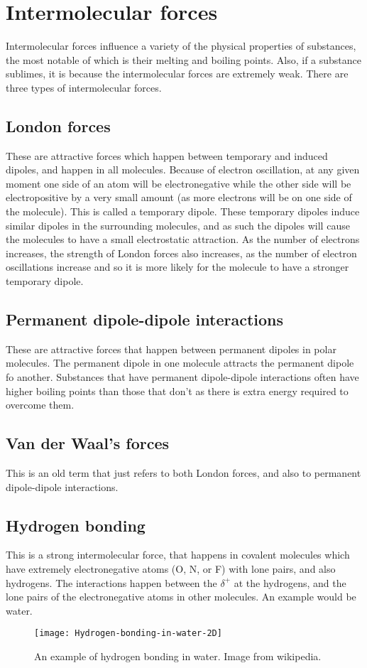 \section{Intermolecular forces}
Intermolecular forces influence a variety of the physical properties of substances, the most notable of which is their melting and boiling points. Also, if a substance sublimes, it is because the intermolecular forces are extremely weak. There are three types of intermolecular forces.

\subsection{London forces}
These are attractive forces which happen between temporary and induced dipoles, and happen in all molecules. Because of electron oscillation, at any given moment one side of an atom will be electronegative while the other side will be electropositive by a very small amount (as more electrons will be on one side of the molecule). This is called a temporary dipole. These temporary dipoles induce similar dipoles in the surrounding molecules, and as such the dipoles will cause the molecules to have a small electrostatic attraction. As the number of electrons increases, the strength of London forces also increases, as the number of electron oscillations increase and so it is more likely for the molecule to have a stronger temporary dipole.

\subsection{Permanent dipole-dipole interactions}
These are attractive forces that happen between permanent dipoles in polar molecules. The permanent dipole in one molecule attracts the permanent dipole fo another. Substances that have permanent dipole-dipole interactions often have higher boiling points than those that don't as there is extra energy required to overcome them.

\subsection{Van der Waal's forces}
This is an old term that just refers to both London forces, and also to permanent dipole-dipole interactions.

\subsection{Hydrogen bonding}
This is a strong intermolecular force, that happens in covalent molecules which have extremely electronegative atoms (O, N, or F) with lone pairs, and also hydrogens. The interactions happen between the $\delta^+$ at the hydrogens, and the lone pairs of the electronegative atoms in other molecules. An example would be water.
\begin{figure}[h]
	\texttt{[image: Hydrogen-bonding-in-water-2D]}
	\centering
	\caption{An example of hydrogen bonding in water. Image from wikipedia.}
\end{figure}
